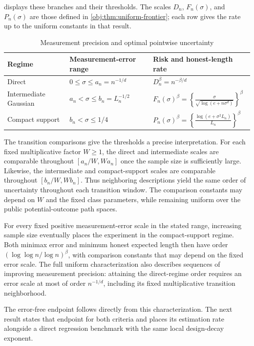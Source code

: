  displays these branches and their thresholds. The scales \(D_n\), \(F_n(\sigma)\), and \(P_n(\sigma)\) are those defined in \cref{obj:thm:uniform-frontier}; each row gives the rate up to the uniform constants in that result.

\begin{table}[htbp]
\centering
\caption{Measurement precision and optimal pointwise uncertainty}
\label{tab:precision-regimes}
\begin{tabular}{lll}
\hline
Regime & Measurement-error range & Risk and honest-length rate \\
\hline
Direct
& \(0\le \sigma\le a_n=n^{-1/d}\)
& \(D_n^\beta=n^{-\beta/d}\) \\[4pt]
Intermediate Gaussian
& \(a_n<\sigma\le b_n=L_n^{-1/2}\)
& \(\displaystyle F_n(\sigma)^\beta
=\left\{\frac{\sigma}{\sqrt{\log(e+n\sigma^d)}}\right\}^{\beta}\) \\[8pt]
Compact support
& \(b_n<\sigma\le1/4\)
& \(\displaystyle P_n(\sigma)^\beta
=\left\{\frac{\log(e+\sigma^2L_n)}{L_n}\right\}^{\beta}\) \\[6pt]
\hline
\end{tabular}
\end{table}

The transition comparisons give the thresholds a precise interpretation. For each fixed multiplicative factor \(W\ge1\), the direct and intermediate scales are comparable throughout \([a_n/W,Wa_n]\) once the sample size is sufficiently large. Likewise, the intermediate and compact-support scales are comparable throughout \([b_n/W,Wb_n]\). Thus neighboring descriptions yield the same order of uncertainty throughout each transition window. The comparison constants may depend on \(W\) and the fixed class parameters, while remaining uniform over the public potential-outcome path spaces.

For every fixed positive measurement-error scale in the stated range, increasing sample size eventually places the experiment in the compact-support regime. Both minimax error and minimum honest expected length then have order \((\log\log n/\log n)^\beta\), with comparison constants that may depend on the fixed error scale. The full uniform characterization also describes sequences of improving measurement precision: attaining the direct-regime order requires an error scale at most of order \(n^{-1/d}\), including its fixed multiplicative transition neighborhood.

The error-free endpoint follows directly from this characterization. The next result states that endpoint for both criteria and places its estimation rate alongside a direct regression benchmark with the same local design-decay exponent.

